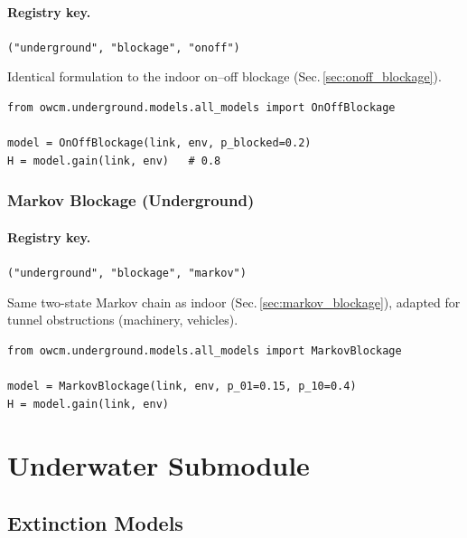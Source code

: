 \documentclass[11pt,a4paper]{article}
\begin{document}
\paragraph{Registry key.} \texttt{("underground", "blockage", "onoff")}

Identical formulation to the indoor on--off blockage (Sec.\,\ref{sec:onoff_blockage}).

\begin{lstlisting}
from owcm.underground.models.all_models import OnOffBlockage

model = OnOffBlockage(link, env, p_blocked=0.2)
H = model.gain(link, env)   # 0.8
\end{lstlisting}

\subsubsection{Markov Blockage (Underground)}
\label{sec:ug_markov}

\paragraph{Registry key.} \texttt{("underground", "blockage", "markov")}

Same two-state Markov chain as indoor (Sec.\,\ref{sec:markov_blockage}),
adapted for tunnel obstructions (machinery, vehicles).

\begin{lstlisting}
from owcm.underground.models.all_models import MarkovBlockage

model = MarkovBlockage(link, env, p_01=0.15, p_10=0.4)
H = model.gain(link, env)
\end{lstlisting}


\newpage
\section{Underwater Submodule}

\subsection{Extinction Models}
\end{document}

